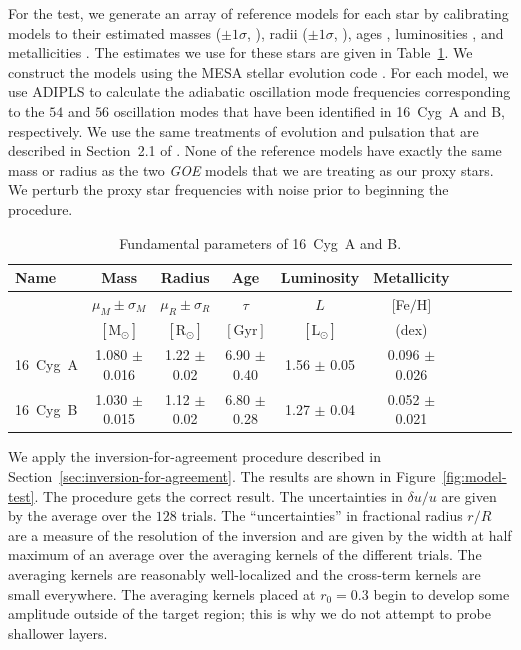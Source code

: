 For the test, we generate an array of reference models for each star by calibrating models to their estimated masses (${\pm 1 \sigma}$, \citealt{2016apj...830...31b}), radii (${\pm 1 \sigma}$, \citealt{2013MNRAS.433.1262W}), ages \citep{2016apj...830...31b}, luminosities \citep{2013MNRAS.433.1262W}, and metallicities \citep{2009A&A...508L..17R}. 
The estimates we use for these stars are given in Table~\ref{tab:stellar-parameters}. 
We construct the models using the MESA stellar evolution code \citep[\emph{Modules for Experiments in Stellar Astrophysics},][]{2011apjs..192....3p}. 
For each model, we use ADIPLS \citep[\emph{the Aarhus adiabatic oscillation package},][]{2008Ap&SS.316..113C} to calculate the adiabatic oscillation mode frequencies corresponding to the $54$ and $56$ oscillation modes that have been identified in 16~Cyg~A and B, respectively. 
We use the same treatments of evolution and pulsation that are described in Section~2.1 of \citealt{2016apj...830...31b}. 
None of the reference models have exactly the same mass or radius as the two \emph{GOE} models that we are treating as our proxy stars. 
We perturb the proxy star frequencies with noise prior to beginning the procedure. 


\begin{table}
\caption{Fundamental parameters of 16~Cyg~A and B. \label{tab:stellar-parameters}}
\hspace*{-0.4cm}
\begin{tabular}{l|ccccccccc} %
    Name &
    Mass &
    Radius &
    Age &
    Luminosity &
    Metallicity &
    \\ \hline
    &
    $\mu_M \pm \sigma_M$ &
    $\mu_R \pm \sigma_R$ &
    $\tau$ &
    $L$ &
    $[$Fe$/$H$]$ &
    \\
    &
    $[\text{M}_\odot]$ &
    $[\text{R}_\odot]$ &
    $[\text{Gyr}]$ &
    $[\text{L}_\odot]$ &
    (dex) \\ \hline%
    16~Cyg~A & 1.080 $\pm$ 0.016 & 1.22 $\pm$ 0.02 & 6.90 $\pm$ 0.40 & 1.56 $\pm$ 0.05 & 0.096 $\pm$ 0.026 \\ 
    16~Cyg~B & 1.030 $\pm$ 0.015 & 1.12 $\pm$ 0.02 & 6.80 $\pm$ 0.28 & 1.27 $\pm$ 0.04 & 0.052 $\pm$ 0.021 \\ \hline
\end{tabular}
\end{table}


We apply the inversion-for-agreement procedure described in Section~\ref{sec:inversion-for-agreement}. 
The results are shown in Figure~\ref{fig:model-test}. 
The procedure gets the correct result. 
The uncertainties in ${\delta u/u}$ are given by the average over the $128$ trials. 
The ``uncertainties'' in fractional radius ${r/R}$ are a measure of the resolution of the inversion and are given by the width at half maximum of an average over the averaging kernels of the different trials. 
The averaging kernels are reasonably well-localized and the cross-term kernels are small everywhere. 
The averaging kernels placed at ${r_0=0.3}$ begin to develop some amplitude outside of the target region; this is why we do not attempt to probe shallower layers. 




